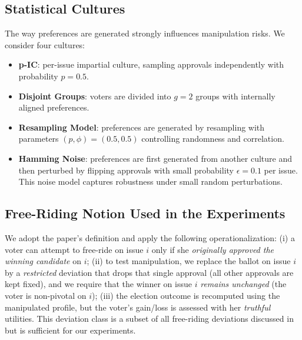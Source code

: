 \documentclass[11pt]{article}
\begin{document}
\subsection{Statistical Cultures}
The way preferences are generated strongly influences manipulation risks.
We consider four cultures:
\begin{itemize}
    \item \textbf{p-IC}: per-issue impartial culture, sampling approvals
    independently with probability $p=0.5$.
    \item \textbf{Disjoint Groups}: voters are divided into $g=2$ groups with
    internally aligned preferences.
    \item \textbf{Resampling Model}: preferences are generated by resampling
    with parameters $(p, \phi) = (0.5, 0.5)$ controlling randomness and correlation.
    \item \textbf{Hamming Noise}: preferences are first generated from another
    culture and then perturbed by flipping approvals with small probability
    $\epsilon=0.1$ per issue. This noise model captures robustness under
    small random perturbations.
\end{itemize}

\subsection{Free-Riding Notion Used in the Experiments}
We adopt the paper’s definition and apply the following operationalization:
(i) a voter can attempt to free-ride on issue $i$ only if she \emph{originally
approved the winning candidate} on $i$; (ii) to test manipulation, we replace
the ballot on issue $i$ by a \emph{restricted} deviation that drops that single
approval (all other approvals are kept fixed), and we require that the winner on
issue $i$ \emph{remains unchanged} (the voter is non-pivotal on $i$); (iii) the
election outcome is recomputed using the manipulated profile, but the voter’s
gain/loss is assessed with her \emph{truthful} utilities.
This deviation class is a subset of all free-riding deviations discussed in
\cite{lackner2023freeriding} but is sufficient for our experiments.
\end{document}
